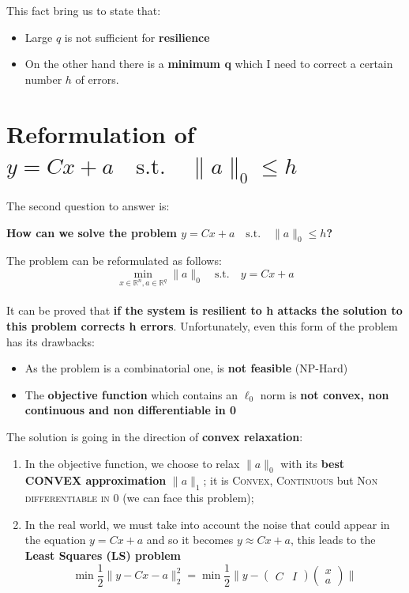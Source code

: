 This fact bring us to state that: 
\begin{itemize}
    \item Large $q$ is not sufficient for \textbf{resilience} 
    \item On the other hand there is a \textbf{minimum q} which I need to correct a certain number $h$ of errors.
\end{itemize}

\section{Reformulation of $y=Cx+a \quad \textrm{s.t.} \quad    \lVert a \rVert_0 \le h$}
\noindent
The second question to answer is: \\
{\begin{center}
\textbf{
    How can we solve the problem $y=Cx+a \quad \textrm{s.t.} \quad    \lVert a \rVert_0 \le h$?}
\end{center}} 
The problem can be reformulated as follows:
{   \large{
        $$\min_{x\in\mathbb{R}^n, a\in\mathbb{R}^q} \lVert a \rVert_0 \quad \textrm{s.t.} \quad y=Cx+a$$
    }
}\\
It can be proved that \textbf{if the system is resilient to h attacks the solution to this problem corrects h errors}. Unfortunately, even this form of the problem has its drawbacks: 
\begin{itemize}
    \item As the problem is a combinatorial one, is \textbf{not feasible} (NP-Hard)
    \item The \textbf{objective function} which contains an $\ell_0$ norm is \textbf{not convex, non continuous and non differentiable in 0}
\end{itemize}
The solution is going in the direction of \textbf{convex relaxation}: 
\begin{enumerate}
    \item In the objective function, we choose to relax $\lVert a \rVert_0$ with its \textbf{best CONVEX approximation} $\lVert a \rVert_1$; it is \textsc{Convex}, \textsc{Continuous} but \textsc{Non differentiable in 0} (we can face this problem);
    \item In the real world, we must take into account the noise that could appear in the equation $y=Cx+a$ and so it becomes $y\approx Cx+a$, this leads to the \textbf{Least Squares (LS) problem} $$\min{ \frac{1}{2}\lVert y-Cx-a \rVert_2^2}= 
    \min{\frac{1}{2}\Bigg\lVert y - \begin{pmatrix}
        C & I 
    \end{pmatrix}\begin{pmatrix}
        x\\
        a
    \end{pmatrix} \Bigg\rVert}$$ 
\end{enumerate}

